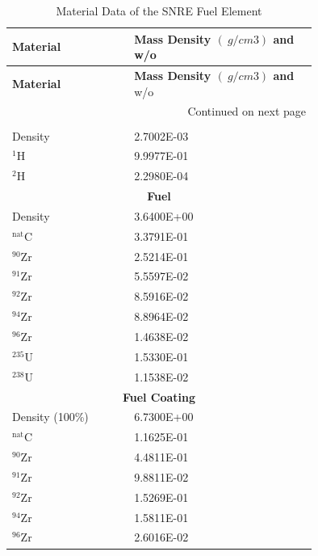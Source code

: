 \documentclass[8pt,a5paper]{article}
\begin{document}
\begin{longtable}{|m{0.3\linewidth}|m{0.45\linewidth}|}
    \caption{Material Data of the SNRE Fuel Element} \\
    
    \hline \textbf{Material} & \textbf{Mass Density $(\SI{}{g/cm3})$ and} w/o \\ \hline 
    \endfirsthead
    
    
    \hline \textbf{Material} & \textbf{Mass Density $(\SI{}{g/cm3})$ and} w/o \\ \hline 
    \endhead
    
    \hline \multicolumn{2}{|r|}{{Continued on next page}} \\ \hline
    \endfoot
    
    \hline
    \endlastfoot
    \multicolumn{2}{|c|}{\textbf{Fuel Element Coolant}}\\\hline
    Density & \SI{2.7002E-03}{} \\
    $^{1}$H & \SI{9.9977E-01}{} \\
    $^{2}$H & \SI{2.2980E-04}{} \\\hline
    \multicolumn{2}{|c|}{\textbf{Fuel}}\\\hline
    Density & \SI{3.6400E+00}{} \\
    $^{\text{nat}}$C & \SI{3.3791E-01}{} \\
    $^{90}$Zr & \SI{2.5214E-01}{} \\
    $^{91}$Zr & \SI{5.5597E-02}{} \\
    $^{92}$Zr & \SI{8.5916E-02}{} \\
    $^{94}$Zr & \SI{8.8964E-02}{} \\
    $^{96}$Zr & \SI{1.4638E-02}{} \\
    $^{235}$U & \SI{1.5330E-01}{} \\
    $^{238}$U & \SI{1.1538E-02}{} \\\hline
    \multicolumn{2}{|c|}{\textbf{Fuel Coating}}\\\hline
    Density (100\%) & \SI{6.7300E+00}{} \\
    $^{\text{nat}}$C & \SI{1.1625E-01}{} \\
    $^{90}$Zr & \SI{4.4811E-01}{} \\
    $^{91}$Zr & \SI{9.8811E-02}{} \\
    $^{92}$Zr & \SI{1.5269E-01}{} \\
    $^{94}$Zr & \SI{1.5811E-01}{} \\
    $^{96}$Zr & \SI{2.6016E-02}{} \\\hline
\end{longtable}
\end{document}
